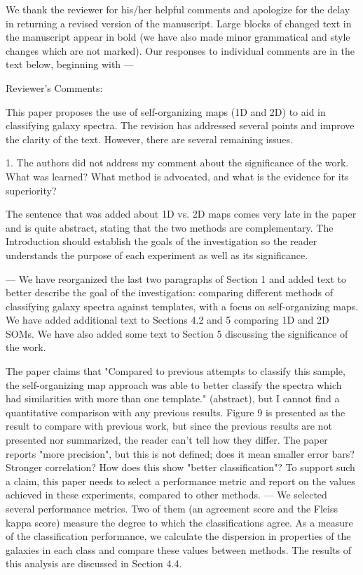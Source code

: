 We thank the reviewer for his/her helpful comments and apologize for the delay in returning a revised version of the manuscript. Large blocks of changed text in the manuscript appear in bold (we have also made minor grammatical and style changes which are not marked). Our responses to individual comments are in the text below, beginning with ---



Reviewer's Comments:

This paper proposes the use of self-organizing maps (1D and 2D) to aid in classifying galaxy spectra.  The revision has addressed several points and improve the clarity of the text.  However, there are several remaining issues.

1. The authors did not address my comment about the significance of the work.  What was learned?  What method is advocated, and what is the evidence for its superiority?

The sentence that was added about 1D vs. 2D maps comes very late in the paper and is quite abstract, stating that the two methods are complementary.  The Introduction should establish the goals of the investigation so the reader understands the purpose of each experiment as well as its significance.

--- We have reorganized the last two paragraphs of Section 1 and added text to better describe the goal of the investigation: comparing different methods of classifying galaxy spectra against templates, with a focus on self-organizing maps.
We have added additional text to Sections 4.2 and 5 comparing 1D and 2D SOMs.
We have also added some text to Section 5 discussing the significance of the work. 


The paper claims that "Compared to previous attempts to classify this sample, the self-organizing map approach was able to better classify the spectra which had similarities with more than one template." (abstract), but I cannot find a quantitative comparison with any previous results.  Figure 9 is presented as the result to compare with previous work, but since the previous results are not presented nor summarized, the reader can't tell how they differ.  The paper reports "more precision", but this is not defined; does it mean smaller error bars?  Stronger correlation?  How does this show "better classification"?  To support such a claim, this paper needs to select a performance metric and report on the values achieved in these experiments, compared to other methods.
--- We selected several performance metrics. Two of them (an agreement score and the Fleiss kappa score) measure the degree to which the classifications agree. 
As a measure of the classification performance, we calculate the dispersion in properties of the galaxies in each class and compare these values between methods. The results of this analysis are discussed in Section 4.4.

